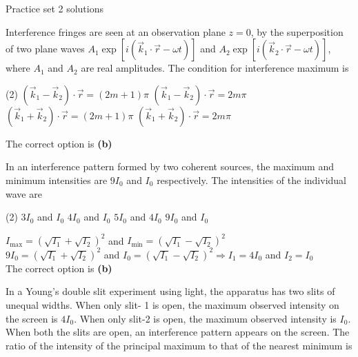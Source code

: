 \newpage
\begin{abox}
	Practice set 2 solutions
	\end{abox}
\begin{enumerate}
\begin{minipage}{\textwidth}
	\item Interference fringes are seen at an observation plane $z=0$, by the superposition of two plane waves $A_{1} \exp \left[i\left(\vec{k}_{1} \cdot \vec{r}-\omega t\right)\right]$ and $A_{2} \exp \left[i\left(\vec{k}_{2} \cdot \vec{r}-\omega t\right)\right]$, where $A_{1}$ and $A_{2}$ are real amplitudes. The condition for interference maximum is
\end{minipage}
\begin{tasks}(2)
	\task[\textbf{A.}] $\left(\vec{k}_{1}-\vec{k}_{2}\right) \cdot \vec{r}=(2 m+1) \pi$
	\task[\textbf{B.}]$\left(\vec{k}_{1}-\vec{k}_{2}\right) \cdot \vec{r}=2 m \pi$
	\task[\textbf{C.}] $\left(\vec{k}_{1}+\vec{k}_{2}\right) \cdot \vec{r}=(2 m+1) \pi$
	\task[\textbf{D.}] $\left(\vec{k}_{1}+\vec{k}_{2}\right) \cdot \vec{r}=2 m \pi$
\end{tasks}
\begin{answer}
	The correct option is \textbf{(b)}
\end{answer}
\begin{minipage}{\textwidth}
	\item In an interference pattern formed by two coherent sources, the maximum and minimum intensities are $9 I_{0}$ and $I_{0}$ respectively. The intensities of the individual wave are
\end{minipage}
\begin{tasks}(2)
	\task[\textbf{A.}] $3 I_{0}$ and $I_{0}$ 
	\task[\textbf{B.}]$4 I_{0}$ and $I_{0}$
	\task[\textbf{C.}]$5 I_{0}$ and $4 I_{0}$
	\task[\textbf{D.}]$9 I_{0}$ and $I_{0}$
\end{tasks}
\begin{answer}
	$I_{\max }=\left(\sqrt{I_{1}}+\sqrt{I_{2}}\right)^{2}$ and $I_{\min }=\left(\sqrt{I_{1}}-\sqrt{I_{2}}\right)^{2}$\\
	$9 I_{0}=\left(\sqrt{I_{1}}+\sqrt{I_{2}}\right)^{2}$ and $I_{0}=\left(\sqrt{I_{1}}-\sqrt{I_{2}}\right)^{2} \Rightarrow I_{1}=4 I_{0}$ and $I_{2}=I_{0}$\\
	The correct option is \textbf{(b)}	
\end{answer}
\begin{minipage}{\textwidth}
	\item In a Young's double slit experiment using light, the apparatus has two slits of unequal widths. When only slit- 1 is open, the maximum observed intensity on the screen is $4 I_{0}$. When only slit-2 is open, the maximum observed intensity is $I_{0}$. When both the slits are open, an interference pattern appears on the screen. The ratio of the intensity of the principal maximum to that of the nearest minimum is

\end{minipage}
\end{enumerate}
